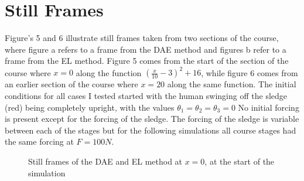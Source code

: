 \documentclass{article}
\begin{document}
\section{Still Frames}
Figure's 5 and 6 illustrate still frames taken from two sections of the course, where figure a refers to a frame from the DAE method and figures b refer to a frame from the EL method. Figure 5 comes from the start of the section of the course where $x = 0$ along the function $(\frac{x}{10}-3)^2+16$, while figure 6 comes from an earlier section of the course where $x=20$ along the same function. The initial conditions for all cases I tested started with the human swinging off the sledge (red) being completely upright, with the values $\theta_1 = \theta_2 = \theta_3=0$ No initial forcing is present except for the forcing of the sledge. The forcing of the sledge is variable between each of the stages but for the following simulations all course stages had the same forcing at $F = 100N$.

\begin{center}
	\begin{figure}[H]
		\centering
		
		\caption{Still frames of the DAE and EL method at $x=0$, at the start of the simulation}%
		\label{fig:example3}%
	\end{figure}
\end{center}
\end{document}
